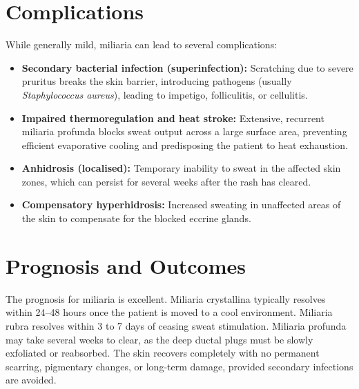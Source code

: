 \section*{Complications}
While generally mild, miliaria can lead to several complications:
\begin{itemize}
    \item \textbf{Secondary bacterial infection (superinfection):} Scratching due to severe pruritus breaks the skin barrier, introducing pathogens (usually \textit{Staphylococcus aureus}), leading to impetigo, folliculitis, or cellulitis.
    \item \textbf{Impaired thermoregulation and heat stroke:} Extensive, recurrent miliaria profunda blocks sweat output across a large surface area, preventing efficient evaporative cooling and predisposing the patient to heat exhaustion.
    \item \textbf{Anhidrosis (localised):} Temporary inability to sweat in the affected skin zones, which can persist for several weeks after the rash has cleared.
    \item \textbf{Compensatory hyperhidrosis:} Increased sweating in unaffected areas of the skin to compensate for the blocked eccrine glands.
\end{itemize}

\section*{Prognosis and Outcomes}
The prognosis for miliaria is excellent. Miliaria crystallina typically resolves within 24--48 hours once the patient is moved to a cool environment. Miliaria rubra resolves within 3 to 7 days of ceasing sweat stimulation. Miliaria profunda may take several weeks to clear, as the deep ductal plugs must be slowly exfoliated or reabsorbed. The skin recovers completely with no permanent scarring, pigmentary changes, or long-term damage, provided secondary infections are avoided.

